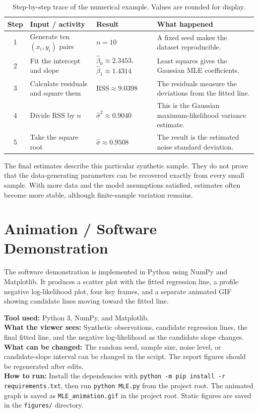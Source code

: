 \documentclass[11pt,a4paper]{article}
\begin{document}
\begin{table}[H]
\centering
\small
\begin{tabularx}{\textwidth}{c X X X}
\toprule
Step & Input / activity & Result & What happened\\
\midrule
1 & Generate ten $(x_i,y_i)$ pairs & $n=10$ & A fixed seed makes the dataset reproducible.\\
2 & Fit the intercept and slope & $\widehat{\beta}_0\approx2.3453$, $\widehat{\beta}_1\approx1.4314$ & Least squares gives the Gaussian MLE coefficients.\\
3 & Calculate residuals and square them & $\mathrm{RSS}\approx9.0398$ & The residuals measure the deviations from the fitted line.\\
4 & Divide RSS by $n$ & $\widehat{\sigma}^2\approx0.9040$ & This is the Gaussian maximum-likelihood variance estimate.\\
5 & Take the square root & $\widehat{\sigma}\approx0.9508$ & The result is the estimated noise standard deviation.\\
\bottomrule
\end{tabularx}
\caption{Step-by-step trace of the numerical example. Values are rounded for display.}
\label{tab:worked}
\end{table}

The final estimates describe this particular synthetic sample. They do not prove that the data-generating parameters can be recovered exactly from every small sample. With more data and the model assumptions satisfied, estimates often become more stable, although finite-sample variation remains.

\section{Animation / Software Demonstration}
The software demonstration is implemented in Python using NumPy and Matplotlib. It produces a scatter plot with the fitted regression line, a profile negative log-likelihood plot, four key frames, and a separate animated GIF showing candidate lines moving toward the fitted line.

\noindent\textbf{Tool used:} Python 3, NumPy, and Matplotlib.\\
\textbf{What the viewer sees:} Synthetic observations, candidate regression lines, the final fitted line, and the negative log-likelihood as the candidate slope changes.\\
\textbf{What can be changed:} The random seed, sample size, noise level, or candidate-slope interval can be changed in the script. The report figures should be regenerated after edits.\\
\textbf{How to run:} Install the dependencies with \texttt{python -m pip install -r requirements.txt}, then run \texttt{python MLE.py} from the project root. The animated graph is saved as \texttt{MLE\_animation.gif} in the project root. Static figures are saved in the \texttt{figures/} directory.
\end{document}
